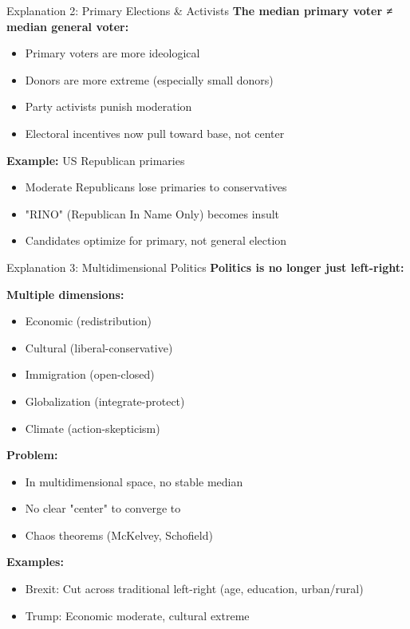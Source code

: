 \documentclass[10pt]{beamer}
\begin{document}
\begin{frame}{Explanation 2: Primary Elections \& Activists}
\textbf{The median primary voter ≠ median general voter:}



\begin{itemize}
\item Primary voters are more ideological
\item Donors are more extreme (especially small donors)
\item Party activists punish moderation
\item Electoral incentives now pull toward \alert{base}, not center
\end{itemize}



\textbf{Example:} US Republican primaries
\begin{itemize}
\item Moderate Republicans lose primaries to conservatives
\item "RINO" (Republican In Name Only) becomes insult
\item Candidates optimize for primary, not general election
\end{itemize}
\end{frame}

\begin{frame}{Explanation 3: Multidimensional Politics}
\textbf{Politics is no longer just left-right:}



\textbf{Multiple dimensions:}
\begin{itemize}
\item Economic (redistribution)
\item Cultural (liberal-conservative)
\item Immigration (open-closed)
\item Globalization (integrate-protect)
\item Climate (action-skepticism)
\end{itemize}



\textbf{Problem:}
\begin{itemize}
\item In multidimensional space, \alert{no stable median}
\item No clear "center" to converge to
\item Chaos theorems (McKelvey, Schofield)
\end{itemize}



\textbf{Examples:}
\begin{itemize}
\item Brexit: Cut across traditional left-right (age, education, urban/rural)
\item Trump: Economic moderate, cultural extreme
\end{itemize}
\end{frame}
\end{document}
